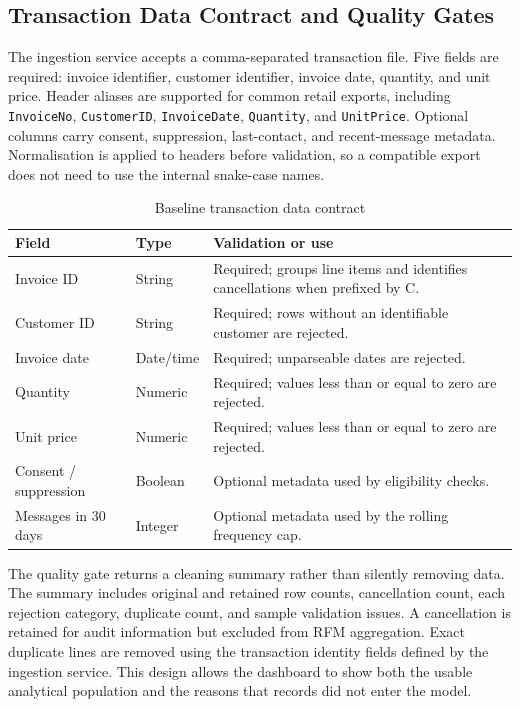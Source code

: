 \documentclass[conference]{IEEEtran}
\begin{document}
\subsection{Transaction Data Contract and Quality Gates}
The ingestion service accepts a comma-separated transaction file. Five fields are required: invoice identifier, customer identifier, invoice date, quantity, and unit price. Header aliases are supported for common retail exports, including \texttt{InvoiceNo}, \texttt{CustomerID}, \texttt{InvoiceDate}, \texttt{Quantity}, and \texttt{UnitPrice}. Optional columns carry consent, suppression, last-contact, and recent-message metadata. Normalisation is applied to headers before validation, so a compatible export does not need to use the internal snake-case names.

\begin{table}[!t]
\caption{Baseline transaction data contract}
\label{tab:data-contract}
\centering
\small
\begin{tabular}{p{}p{}p{}}
\toprule
Field & Type & Validation or use \\
\midrule
Invoice ID & String & Required; groups line items and identifies cancellations when prefixed by C. \\
Customer ID & String & Required; rows without an identifiable customer are rejected. \\
Invoice date & Date/time & Required; unparseable dates are rejected. \\
Quantity & Numeric & Required; values less than or equal to zero are rejected. \\
Unit price & Numeric & Required; values less than or equal to zero are rejected. \\
Consent / suppression & Boolean & Optional metadata used by eligibility checks. \\
Messages in 30 days & Integer & Optional metadata used by the rolling frequency cap. \\
\bottomrule
\end{tabular}
\end{table}

The quality gate returns a cleaning summary rather than silently removing data. The summary includes original and retained row counts, cancellation count, each rejection category, duplicate count, and sample validation issues. A cancellation is retained for audit information but excluded from RFM aggregation. Exact duplicate lines are removed using the transaction identity fields defined by the ingestion service. This design allows the dashboard to show both the usable analytical population and the reasons that records did not enter the model.
\end{document}
